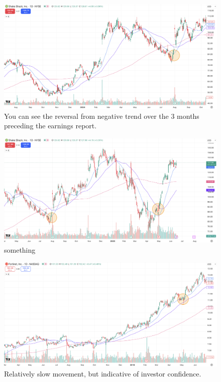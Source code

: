 \documentclass[11pt]{article}
\begin{document}
    \begin{figure}[H]
        \centering
        \includegraphics[width=1.0\linewidth]{images/SHAK1.png}
        \caption{You can see the reversal from negative trend over the 3 months preceding the earnings report.}
        \label{fig:SHAK1}
    \end{figure}

    \begin{figure}[H]
        \centering
        \includegraphics[width=1.0\linewidth]{images/SHAK2.png}
        \caption{something}
        \label{fig:SHAK2}
    \end{figure}

    \begin{figure}[H]
        \centering
        \includegraphics[width=1.0\linewidth]{images/FTNT1.png}
        \caption{Relatively slow movement, but indicative of investor confidence.}
        \label{fig:FTNT1}
    \end{figure}
\end{document}
